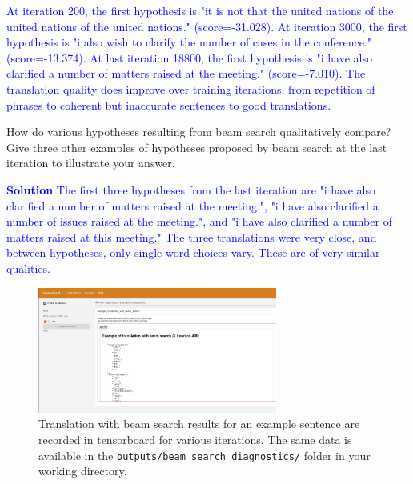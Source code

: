 \begin{parts}
\begin{subparts}
        \textcolor{blue}{
            At iteration 200, the first hypothesis is "it is not that the united nations of the united nations of the united nations." (score=-31.028). At iteration 3000, the first hypothesis is "i also wish to clarify the number of cases in the conference." (score=-13.374). At last iteration 18800, the first hypothesis is "i have also clarified a number of matters raised at the meeting." (score=-7.010). The translation quality does improve over training iterations, from repetition of phrases to coherent but inaccurate sentences to good translations.
        }

        
        \subpart[2] How do various hypotheses resulting from beam search qualitatively compare? Give three other examples of hypotheses proposed by beam search at the last iteration to illustrate your answer.

        \textcolor{blue}{
            \textbf{Solution} The first three hypotheses from the last iteration are "i have also clarified a number of matters raised at the meeting.", "i have also clarified a number of issues raised at the meeting.", and "i have also clarified a number of matters raised at this meeting." The three translations were very close, and between hypotheses, only single word choices vary. These are of very similar qualities.
        }

        
        
    \end{subparts}



    \begin{figure}
        \centering
        \includegraphics[width=0.7\textwidth]{images/example_translation_beam.jpg}
        \caption{Translation with beam search results for an example sentence are recorded in tensorboard for various iterations. The same data is available in the \texttt{outputs/beam\_search\_diagnostics/} folder in your working directory.}
        \label{fig:beam-search-diagnostics-tensorboard}
    \end{figure}
    

\end{parts}
